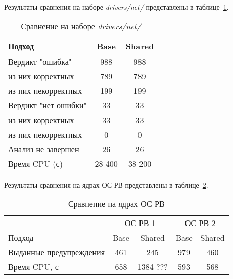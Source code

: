 Результаты сравнения на наборе \textit{drivers/net/} представлены в таблице~\ref{table-drivers-shared}.

  \begin{table}[h]\footnotesize \centering
    \caption{Сравнение на наборе \textit{drivers/net/}}
  	\label{table-drivers-shared}
    \begin{tabular}{ | l | c | c |}
      \hline
      Подход         				& Base 	& Shared 	\\ \hline
      Вердикт "ошибка" 				& 988   & 988    	\\ 
  \hspace{0.5cm} из них корректных 	& 789 	& 789 		\\ 
  \hspace{0.5cm} из них некорректных & 199 	& 199 		\\ \hline
      Вердикт "нет ошибки"  		& 33    & 33    	\\ 
  \hspace{0.5cm} из них корректных 	& 33 	& 33    	\\
  \hspace{0.5cm} из них некорректных & 0 	& 0    		\\ \hline
      Анализ не завершен       		& 26    & 26     	\\ \hline
      Время CPU (с)   				& 28 400 & 38 200  	\\ 
      \hline
    \end{tabular}
  \end{table}


Результаты сравнения на ядрах ОС РВ представлены в таблице~\ref{table-os-shared}.

  \begin{table}[h]\footnotesize \centering
  	\label{table-os-shared}
    \caption{Сравнение на ядрах ОС РВ}
    \begin{tabular}{ | l | c | c | c | c |  }
      \hline
      		& 			 \multicolumn{2}{|c|}{ОС РВ 1} & 	\multicolumn{2}{|c|}{ОС РВ 2}\\
      Подход         					& Base  & Shared  	& Base  & Shared 	\\ \hline
      Выданные предупреждения			& 461   & 245    	& 979   & 460  			\\ 
  	  Время CPU, с 						& 658   & 1384  ???	& 593   & 568  		\\ 
      \hline
    \end{tabular}
  \end{table}

